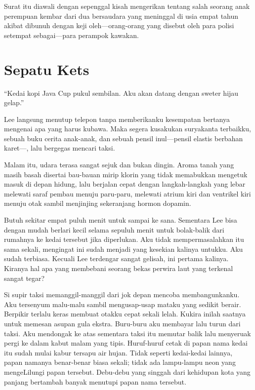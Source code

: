 \documentclass[smalldemyvopaper,11pt,twoside,onecolumn,openright,extrafontsizes]{memoir}
\begin{document}

Surat itu diawali dengan sepenggal kisah mengerikan tentang salah seorang anak perempuan kembar dari dua bersaudara yang meninggal di usia empat tahun akibat dibunuh dengan keji oleh---orang-orang yang disebut oleh para polisi setempat sebagai---para perampok kawakan.


\chapter{Sepatu Kets}

``Kedai kopi Java Cup pukul sembilan. Aku akan datang dengan sweter hijau gelap.''

Lee langsung menutup telepon tanpa memberikanku kesempatan bertanya mengenai apa yang harus kubawa. Maka segera kusakukan suryakanta terbaikku, sebuah buku cerita anak-anak, dan sebuah pensil inul---pensil elastis berbahan karet---, lalu bergegas mencari taksi.


Malam itu, udara terasa sangat sejuk dan bukan dingin. Aroma tanah yang masih basah disertai bau-bauan mirip klorin yang tidak memabukkan mengetuk masuk di depan hidung, lalu berjalan cepat dengan langkah-langkah yang lebar melewati saraf pembau menuju paru-paru, melewati atrium kiri dan ventrikel kiri menuju otak sambil menjinjing sekeranjang hormon dopamin.

Butuh sekitar empat puluh menit untuk sampai ke sana. Sementara Lee bisa dengan mudah berlari kecil selama sepuluh menit untuk bolak-balik dari rumahnya ke kedai tersebut jika diperlukan. Aku tidak mempermasalahkan itu sama sekali, mengingat ini sudah menjadi yang kesekian kalinya untukku. Aku sudah terbiasa. Kecuali Lee terdengar sangat gelisah, ini pertama kalinya. Kiranya hal apa yang membebani seorang bekas perwira laut yang terkenal sangat tegar?


Si supir taksi memanggil-manggil dari jok depan mencoba membangunkanku. Aku tersenyum malu-malu sambil mengusap-usap mataku yang sedikit berair. Berpikir terlalu keras membuat otakku cepat sekali lelah. Kukira inilah saatnya untuk memesan asupan gula ekstra. Buru-buru aku membayar lalu turun dari taksi. Aku mendongak ke atas sementara taksi itu memutar balik lalu menyeruak pergi ke dalam kabut malam yang tipis. Huruf-huruf cetak di papan nama kedai itu sudah mulai kabur tersapu air hujan. Tidak seperti kedai-kedai lainnya, papan namanya benar-benar biasa sekali; tidak ada lampu-lampu neon yang mengeLilungi papan tersebut. Debu-debu yang singgah dari kehidupan kota yang panjang bertambah banyak menutupi papan nama tersebut.
\end{document}
